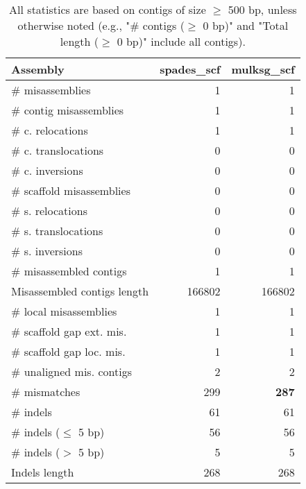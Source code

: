 \documentclass[12pt,a4paper]{article}
\begin{document}
\begin{table}[ht]
\begin{center}
\caption{All statistics are based on contigs of size $\geq$ 500 bp, unless otherwise noted (e.g., "\# contigs ($\geq$ 0 bp)" and "Total length ($\geq$ 0 bp)" include all contigs).}
\begin{tabular}{|l*{2}{|r}|}
\hline
Assembly & spades\_scf & mulksg\_scf \\ \hline
\# misassemblies & 1 & 1 \\ \hline
\hspace{2mm}\# contig misassemblies & 1 & 1 \\ \hline
\hspace{5mm}\# c. relocations & 1 & 1 \\ \hline
\hspace{5mm}\# c. translocations & 0 & 0 \\ \hline
\hspace{5mm}\# c. inversions & 0 & 0 \\ \hline
\hspace{2mm}\# scaffold misassemblies & 0 & 0 \\ \hline
\hspace{5mm}\# s. relocations & 0 & 0 \\ \hline
\hspace{5mm}\# s. translocations & 0 & 0 \\ \hline
\hspace{5mm}\# s. inversions & 0 & 0 \\ \hline
\# misassembled contigs & 1 & 1 \\ \hline
Misassembled contigs length & 166802 & 166802 \\ \hline
\# local misassemblies & 1 & 1 \\ \hline
\# scaffold gap ext. mis. & 1 & 1 \\ \hline
\# scaffold gap loc. mis. & 1 & 1 \\ \hline
\# unaligned mis. contigs & 2 & 2 \\ \hline
\# mismatches & 299 & {\bf 287} \\ \hline
\# indels & 61 & 61 \\ \hline
\hspace{5mm}\# indels ($\leq$ 5 bp) & 56 & 56 \\ \hline
\hspace{5mm}\# indels ($>$ 5 bp) & 5 & 5 \\ \hline
Indels length & 268 & 268 \\ \hline
\end{tabular}
\end{center}
\end{table}
\end{document}
